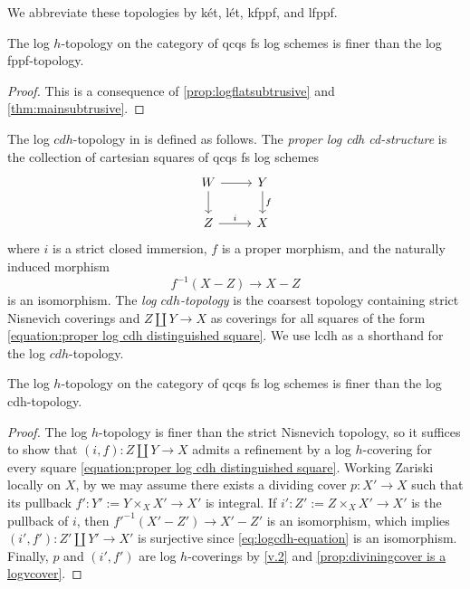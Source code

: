 \documentclass[10pt]{amsart}
\begin{document}
We abbreviate these topologies by k\'et, l\'et, kfppf, and lfppf.




\begin{proposition}
\label{prop:log flat vs log v}
The log $h$-topology on the category of qcqs fs log schemes is finer than the log fppf-topology.
\end{proposition}
\begin{proof}
This is a consequence of \cref{prop:logflatsubtrusive} and \cref{thm:mainsubtrusive}.
\end{proof}



The log $cdh$-topology in \cite[Definition 2.1]{regGysin} is defined as follows.
The \emph{proper log cdh cd-structure} is the collection of cartesian squares of qcqs fs log schemes
\begin{equation}
\label{equation:proper log cdh distinguished square}
\begin{tikzcd}
W\ar[d]\ar[r]&
Y\ar[d,"f"]
\\
Z\ar[r,"i"]&
X
\end{tikzcd}
\end{equation}
where $i$ is a strict closed immersion, $f$ is a proper morphism, 
and the naturally induced morphism 
\begin{equation}\label{eq:logcdh-equation}
f^{-1}(X-Z)\longrightarrow X-Z
\end{equation}
is an isomorphism.
The \emph{log $cdh$-topology} is the coarsest topology containing strict Nisnevich coverings and 
$Z\amalg Y\to X$ as coverings for all 
squares of the form \eqref{equation:proper log cdh distinguished square}. 
We use lcdh as a shorthand for the log $cdh$-topology.


\begin{proposition}
\label{proposition:the log h-topology is finer than the log cdh-topology}
The log $h$-topology on the category of qcqs fs log schemes is finer than the log cdh-topology.
\end{proposition}
\begin{proof}
The log $h$-topology is finer than the strict Nisnevich topology,
so it suffices to show that $(i,f)\colon Z\amalg Y\to X$ admits a refinement by a log $h$-covering 
for every square \eqref{equation:proper log cdh distinguished square}.
Working Zariski locally on $X$,
by \cite[Theorem 1.1]{integrallogblowup}
we may assume there exists a dividing cover $p\colon X'\to X$ such that its pullback 
$f'\colon Y':=Y\times_X X'\to X'$ is integral.
If $i'\colon Z':=Z\times_X X'\to X'$ is the pullback of $i$, 
then $f'^{-1}(X'-Z')\to X'-Z'$ 
is an isomorphism,
which implies $(i',f')\colon Z'\amalg Y'\to X'$ is surjective since 
\eqref{eq:logcdh-equation} is an isomorphism.
Finally,
$p$ and $(i',f')$ are log $h$-coverings by \cref{v.2} and \cref{prop:diviningcover is a logvcover}.
\end{proof}
\end{document}

